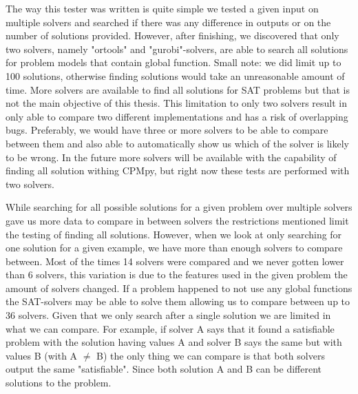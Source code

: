 The way this tester was written is quite simple we tested a given input on multiple solvers and searched if there was any difference in outputs or on the number of solutions provided.
However, after finishing, we discovered that only two solvers, namely "ortools" and "gurobi"-solvers, are able to search all solutions for problem models that contain global function. Small note: we did limit up to 100 solutions, otherwise finding solutions would take an unreasonable amount of time. More solvers are available to find all solutions for SAT problems but that is not the main objective of this thesis. This limitation to only two solvers result in only able to compare two different implementations and has a risk of overlapping bugs. Preferably, we would have three or more solvers to be able to compare between them and also able to automatically show us which of the solver is likely to be wrong. In the future more solvers will be available with the capability of finding all solution withing CPMpy, but right now these tests are performed with two solvers. 

While searching for all possible solutions for a given problem over multiple solvers gave us more data to compare in between solvers the restrictions mentioned limit the testing of finding all solutions. However, when we look at only searching for one solution for a given example, we have more than enough solvers to compare between. Most of the times 14 solvers were compared and we never gotten lower than 6 solvers, this variation is due to the features used in the given problem the amount of solvers changed. If a problem happened to not use any global functions the SAT-solvers may be able to solve them allowing us to compare between up to 36 solvers. Given that we only search after a single solution we are limited in what we can compare. For example, if solver A says that it found a satisfiable problem with the solution having values A and solver B says the same but with values B (with A $\neq$ B) the only thing we can compare is that both solvers output the same "satisfiable". Since both solution A and B can be different solutions to the problem.


